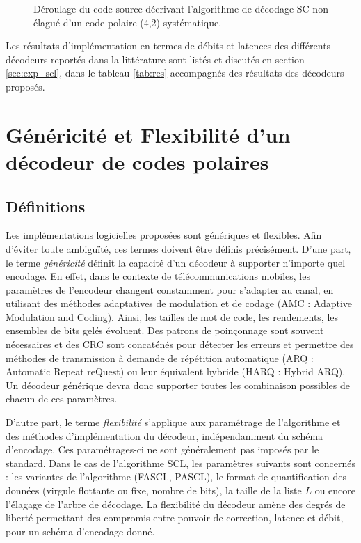 \begin{figure}[t]
{\begin{minipage}{.35\linewidth}
  \label{fig:unrolled_tree}
  \end{minipage}%
  }
  \caption{Déroulage du code source décrivant l'algorithme de décodage SC non élagué d'un code polaire (4,2) systématique.}
  \label{fig:unrolling}
\end{figure}

Les résultats d'implémentation en termes de débits et latences des différents décodeurs reportés dans la littérature \cite{sarkis_increasing_2014,sarkis_fast_2016,shen_low-latency_2016} sont listés et discutés en section \ref{sec:exp_scl}, dans le tableau \ref{tab:res} accompagnés des résultats des décodeurs proposés.

\section{Généricité et Flexibilité d'un décodeur de codes polaires}

\label{sec:gen_scl}
\subsection{Définitions}
Les implémentations logicielles proposées sont génériques et flexibles. Afin d'éviter toute ambiguïté, ces termes doivent être définis précisément.
D'une part, le terme \textit{généricité} définit la capacité d'un décodeur à supporter n'importe quel encodage.
En effet, dans le contexte de télécommunications mobiles, les paramètres de l'encodeur changent constamment pour s'adapter au canal, en utilisant des méthodes adaptatives de modulation et de codage \cite{dahlman_4g:_2013} (AMC : Adaptive Modulation and Coding). Ainsi, les tailles de mot de code, les rendements, les ensembles de bits gelés évoluent. Des patrons de poinçonnage sont souvent nécessaires et des CRC sont concaténés pour détecter les erreurs et permettre des méthodes de transmission à demande de répétition automatique (ARQ : Automatic Repeat reQuest) ou leur équivalent hybride (HARQ : Hybrid ARQ). Un décodeur générique devra donc supporter toutes les combinaison possibles de chacun de ces paramètres.

D'autre part, le terme \textit{flexibilité} s'applique aux paramétrage de l'algorithme et des méthodes d'implémentation du décodeur, indépendamment du schéma d'encodage. Ces paramétrages-ci ne sont généralement pas imposés par le standard. Dans le cas de l'algorithme SCL, les paramètres suivants sont concernés : les variantes de l'algorithme (FASCL, PASCL), le format de quantification des données (virgule flottante ou fixe, nombre de bits), la taille de la liste $L$ ou encore l'élagage de l'arbre de décodage. La flexibilité du décodeur amène des degrés de liberté permettant des compromis entre pouvoir de correction, latence et débit, pour un schéma d'encodage donné.

